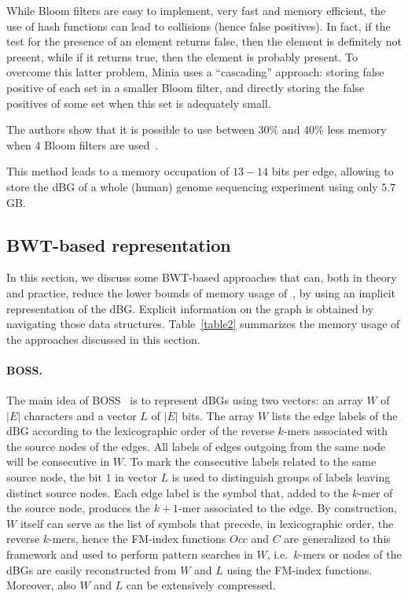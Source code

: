 \documentclass[11pt,oneside,a4paper]{article}
\begin{document}
While Bloom filters are easy to implement, very fast and memory efficient, the use of hash functions can lead to collisions (hence false positives).
In fact, if the test for the presence of an element returns false, then the element is definitely not present, while if it returns true, then the element is probably present.  To overcome this latter problem, Minia uses a ``cascading'' approach: storing false positive of each set in a smaller Bloom filter, and directly storing the false positives of some set when this set is adequately small. 


The authors show that it is possible to use
between $30\%$ and $40\%$ less memory when $4$ Bloom filters are used~\cite{DBLP:conf/wabi/SalikhovSK13}. 

This method leads to a memory occupation of $13-14$ bits per edge, allowing
to store the dBG of a whole (human) genome sequencing experiment using only $5.7$GB.

\subsection{BWT-based representation}

In this section, we discuss some BWT-based approaches that can, both in theory and practice, reduce the
lower bounds of memory usage of~\cite{Conway15022011}, by using
an implicit representation of the dBG.
Explicit information on the graph is obtained by navigating those data structures.
Table~\ref{table2} summarizes the memory usage of the approaches discussed in this section.


\paragraph{BOSS.}
The main idea of BOSS~\cite{Bowe12} is to represent dBGs using two vectors: an array $W$ of $|E|$
characters and a vector $L$ of $|E|$ bits. The array $W$ lists the edge labels of the dBG according to the lexicographic order of the reverse $k$-mers associated with the source nodes of the edges. All labels of edges outgoing from the same node will be consecutive in $W$. To mark the consecutive  labels
related to the same source node, the bit $1$ in vector $L$ is used to distinguish 
 groups of labels leaving distinct source nodes. 
Each edge label is the  symbol  that, added to the $k$-mer of the source node, produces the $k+1$-mer associated to the edge. By construction, $W$ itself can serve as the list  of symbols that precede, in lexicographic order, the reverse $k$-mers, hence the FM-index functions $Occ$ and $C$ are generalized to this framework and used to perform pattern searches in $W$, i.e.~$k$-mers or nodes of the dBGs are easily reconstructed  from $W$ and $L$ using the FM-index functions.
Moreover, also $W$ and $L$ can be extensively compressed.
\end{document}
